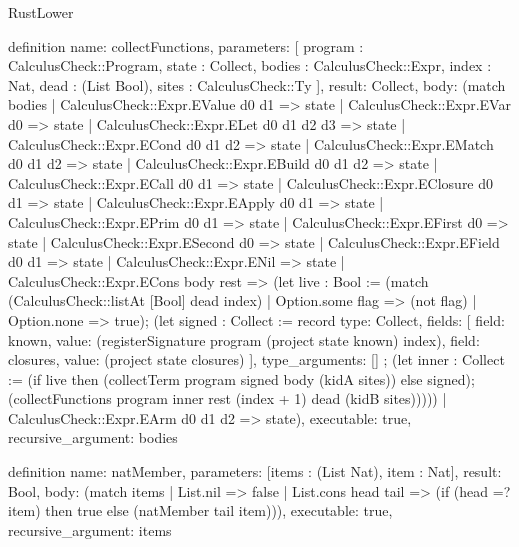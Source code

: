 \begin{lexlean}{RustLower}
\begin{semanticmodule}
definition{
  name: collectFunctions,
  parameters: [
    program : CalculusCheck::Program,
    state : Collect,
    bodies : CalculusCheck::Expr,
    index : Nat,
    dead : (List Bool),
    sites : CalculusCheck::Ty
  ],
  result: Collect,
  body: (match bodies
    | CalculusCheck::Expr.EValue d0 d1 => state
    | CalculusCheck::Expr.EVar d0 => state
    | CalculusCheck::Expr.ELet d0 d1 d2 d3 => state
    | CalculusCheck::Expr.ECond d0 d1 d2 => state
    | CalculusCheck::Expr.EMatch d0 d1 d2 => state
    | CalculusCheck::Expr.EBuild d0 d1 d2 => state
    | CalculusCheck::Expr.ECall d0 d1 => state
    | CalculusCheck::Expr.EClosure d0 d1 => state
    | CalculusCheck::Expr.EApply d0 d1 => state
    | CalculusCheck::Expr.EPrim d0 d1 => state
    | CalculusCheck::Expr.EFirst d0 => state
    | CalculusCheck::Expr.ESecond d0 => state
    | CalculusCheck::Expr.EField d0 d1 => state
    | CalculusCheck::Expr.ENil => state
    | CalculusCheck::Expr.ECons body rest => (let live : Bool := (match (CalculusCheck::listAt [Bool] dead index)
      | Option.some flag => (not flag)
      | Option.none => true); (let signed : Collect := record{
      type: Collect,
      fields: [
        {field: known, value: (registerSignature program (project state known) index)},
        {field: closures, value: (project state closures)}
      ],
      type_arguments: []
    }; (let inner : Collect := (if live then (collectTerm program signed body (kidA sites)) else signed); (collectFunctions program inner rest (index + 1) dead (kidB sites)))))
    | CalculusCheck::Expr.EArm d0 d1 d2 => state),
  executable: true,
  recursive_argument: bodies
}

definition{
  name: natMember,
  parameters: [items : (List Nat), item : Nat],
  result: Bool,
  body: (match items
    | List.nil => false
    | List.cons head tail => (if (head =? item) then true else (natMember tail item))),
  executable: true,
  recursive_argument: items
}


\end{semanticmodule}
\end{lexlean}
